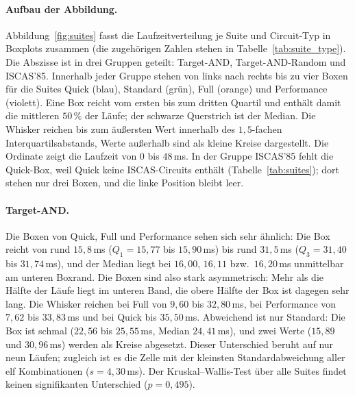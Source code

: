 \documentclass[a4paper,12pt]{article}
\theoremstyle{definition}
\begin{document}
\paragraph{Aufbau der Abbildung.} Abbildung~\ref{fig:suites} fasst die Laufzeitverteilung je Suite und Circuit-Typ in Boxplots zusammen (die zugehörigen Zahlen stehen in Tabelle~\ref{tab:suite_type}). Die Abszisse ist in drei Gruppen geteilt: Target-AND, Target-AND-Random und ISCAS'85. Innerhalb jeder Gruppe stehen von links nach rechts bis zu vier Boxen für die Suites Quick (blau), Standard (grün), Full (orange) und Performance (violett). Eine Box reicht vom ersten bis zum dritten Quartil und enthält damit die mittleren $50\,\%$ der Läufe; der schwarze Querstrich ist der Median. Die Whisker reichen bis zum äußersten Wert innerhalb des $1{,}5$-fachen Interquartilsabstands, Werte außerhalb sind als kleine Kreise dargestellt. Die Ordinate zeigt die Laufzeit von $0$ bis $48$\,ms. In der Gruppe ISCAS'85 fehlt die Quick-Box, weil Quick keine ISCAS-Circuits enthält (Tabelle~\ref{tab:suites}); dort stehen nur drei Boxen, und die linke Position bleibt leer.

\paragraph{Target-AND.} Die Boxen von Quick, Full und Performance sehen sich sehr ähnlich: Die Box reicht von rund $15{,}8$\,ms ($Q_1 = 15{,}77$ bis $15{,}90$\,ms) bis rund $31{,}5$\,ms ($Q_3 = 31{,}40$ bis $31{,}74$\,ms), und der Median liegt bei $16{,}00$, $16{,}11$ bzw.\ $16{,}20$\,ms unmittelbar am unteren Boxrand. Die Boxen sind also stark asymmetrisch: Mehr als die Hälfte der Läufe liegt im unteren Band, die obere Hälfte der Box ist dagegen sehr lang. Die Whisker reichen bei Full von $9{,}60$ bis $32{,}80$\,ms, bei Performance von $7{,}62$ bis $33{,}83$\,ms und bei Quick bis $35{,}50$\,ms. Abweichend ist nur Standard: Die Box ist schmal ($22{,}56$ bis $25{,}55$\,ms, Median $24{,}41$\,ms), und zwei Werte ($15{,}89$ und $30{,}96$\,ms) werden als Kreise abgesetzt. Dieser Unterschied beruht auf nur neun Läufen; zugleich ist es die Zelle mit der kleinsten Standardabweichung aller elf Kombinationen ($s = 4{,}30$\,ms). Der Kruskal--Wallis-Test über alle Suites findet keinen signifikanten Unterschied ($p = 0{,}495$).
\end{document}
